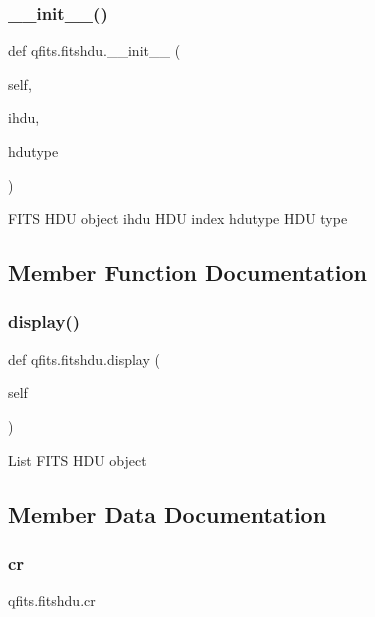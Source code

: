 \subsubsection{\texorpdfstring{\+\_\+\+\_\+init\+\_\+\+\_\+()}{\_\_init\_\_()}}
{\footnotesize\ttfamily def qfits.\+fitshdu.\+\_\+\+\_\+init\+\_\+\+\_\+ (\begin{DoxyParamCaption}\item[{}]{self,  }\item[{}]{ihdu,  }\item[{}]{hdutype }\end{DoxyParamCaption})}

\begin{DoxyVerb}FITS HDU object
    ihdu    HDU index
    hdutype HDU type
\end{DoxyVerb}
 

\subsection{Member Function Documentation}
\mbox{\label{classqfits_1_1fitshdu_a5e5c34f9b2f49bbdb8b3ab3f98384b52}} 
\subsubsection{\texorpdfstring{display()}{display()}}
{\footnotesize\ttfamily def qfits.\+fitshdu.\+display (\begin{DoxyParamCaption}\item[{}]{self }\end{DoxyParamCaption})}

\begin{DoxyVerb}List FITS HDU object\end{DoxyVerb}
 

\subsection{Member Data Documentation}
\mbox{\label{classqfits_1_1fitshdu_a1781bbe89501c65b782bc42c062a9cbe}} 
\subsubsection{\texorpdfstring{cr}{cr}}
{\footnotesize\ttfamily qfits.\+fitshdu.\+cr}

